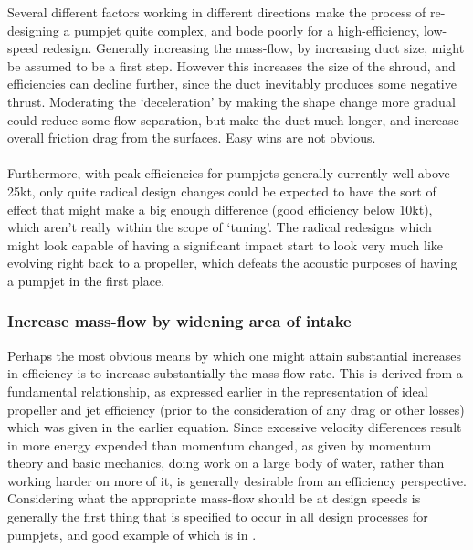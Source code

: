 \documentclass{article}\usepackage[]{graphicx}\usepackage[]{color}
\begin{document}
\begin{tcolorbox}[width=0.8\textwidth, center, colback=blue!5!white,colframe=blue!75!black, title= Can we just `tune' the pumpjet to be more efficient at low speeds?]
Several different factors working in different directions make the process of re-designing a pumpjet quite complex, and bode poorly for a high-efficiency, low-speed redesign.  Generally increasing the mass-flow, by increasing duct size, might be assumed to be a first step. However this increases the size of the shroud, and efficiencies can decline further, since the duct inevitably produces some negative thrust.  Moderating the `deceleration' by making the shape change more gradual could reduce some flow separation, but make the duct much longer, and increase overall friction drag from the surfaces.  Easy wins are not obvious.
\\
\\
Furthermore, with peak efficiencies for pumpjets generally currently well above 25kt, only quite radical design changes could be expected to have the sort of effect that might make a big enough difference (good efficiency below 10kt), which aren't really within the scope of `tuning'.  The radical redesigns which might look capable of having a significant impact start to look very much like evolving right back to a propeller, which defeats the acoustic purposes of having a pumpjet in the first place.
\end{tcolorbox}

\subsubsection{Increase mass-flow by widening area of intake}
Perhaps the most obvious means by which one might attain substantial increases in efficiency is to increase substantially the mass flow rate.  This is derived from a fundamental relationship, as expressed earlier in the representation of ideal propeller and jet efficiency (prior to the consideration of any drag or other losses) which was given in the earlier equation.  Since excessive velocity differences result in more energy expended than momentum changed, as given by momentum theory and basic mechanics, doing work on a large body of water, rather than working harder on more of it, is generally desirable from an efficiency perspective.  Considering what the appropriate mass-flow should be at design speeds is generally the first thing that is specified to occur in all design processes for pumpjets, and good example of which is in \cite[6-7]{henderson1964}.
\end{document}
